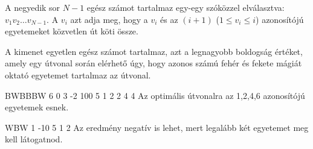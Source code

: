 A negyedik sor $N-1$ egész számot tartalmaz egy-egy szóközzel elválasztva: $v_1 v_2 \ldots v_{N-1}$. A $v_i$ azt adja meg, hogy a $v_i$ és az $(i+1)$ ($1 \leq v_i \leq i$) azonosítójú egyetemeket közvetlen út köti össze.


A kimenet egyetlen egész számot tartalmaz, azt a legnagyobb boldogság értéket, amely egy útvonal során elérhető úgy, hogy azonos számú fehér és fekete mágiát oktató egyetemet tartalmaz az útvonal.



BWBBBW
6 0 3 -2 100 5
1 2 2 4 4
\sampleCOMMENT
Az optimális útvonalra az 1,2,4,6 azonosítójú egyetemek esnek.
\sampleEND

\bigskip

WBW
1 -10 5
1 2
\sampleCOMMENT
Az eredmény negatív is lehet, mert legalább két egyetemet meg kell látogatnod.
\sampleEND


